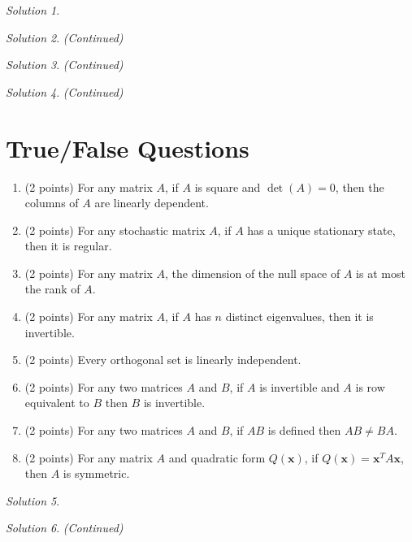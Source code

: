 \documentclass{article}
\theoremstyle{remark} \newtheorem*{solution}{Solution}
\newcommand{\vv}[1]{\mathbf{#1}} \newcommand{\R}{\mathbb R}
\begin{document}
\begin{solution}
\end{solution}

\pagebreak
\begin{solution}
  \textit{(Continued)}
\end{solution}

\pagebreak
\begin{solution}
  \textit{(Continued)}
\end{solution}

\pagebreak
\begin{solution}
  \textit{(Continued)}
\end{solution}

\pagebreak
\section{True/False Questions}

\begin{enumerate}
\item (2 points) For any matrix $A$, if $A$ is square and $\det(A) =
  0$, then the columns of $A$ are linearly dependent.
\item (2 points) For any stochastic matrix $A$, if $A$ has a unique
  stationary state, then it is regular.
\item (2 points) For any matrix $A$, the dimension of the null space
  of $A$ is at most the rank of $A$.
\item (2 points) For any matrix $A$, if $A$ has $n$ distinct
  eigenvalues, then it is invertible.
\item (2 points) Every orthogonal set is linearly independent.
\item (2 points) For any two matrices $A$ and $B$, if $A$ is
  invertible and $A$ is row equivalent to $B$ then $B$ is invertible.
\item (2 points) For any two matrices $A$ and $B$, if $AB$ is defined
  then $AB \not = BA$.
\item (2 points) For any matrix $A$ and quadratic form $Q(\vv x)$, if
  $Q(\vv x) = \vv x^TA\vv x$, then $A$ is symmetric.
\end{enumerate}

\medskip

\begin{solution}
\end{solution}

\pagebreak
\begin{solution}
  \textit{(Continued)}
\end{solution}
\end{document}
